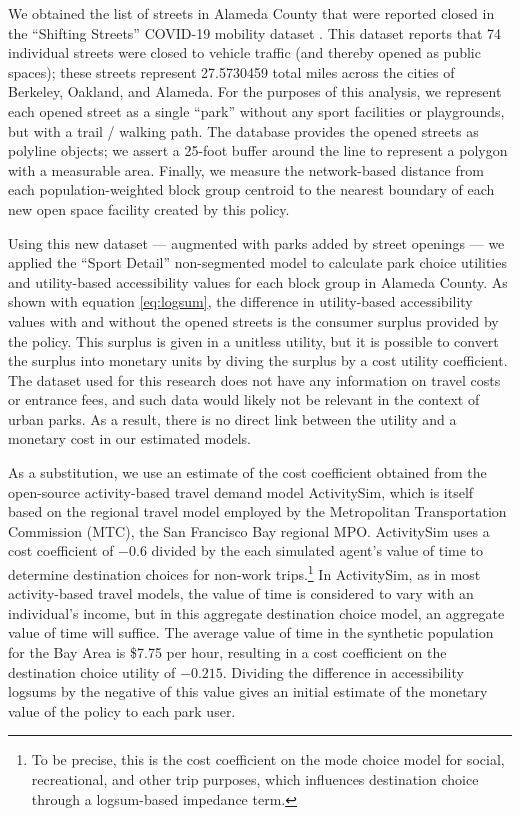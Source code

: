 \documentclass[]{elsarticle} %
\begin{document}
We obtained the list of streets in Alameda County that were reported closed
in the ``Shifting Streets'' COVID-19 mobility dataset \citep{slowstreets}. This dataset
reports that 74 individual streets were closed to vehicle
traffic (and thereby opened as public spaces); these streets represent
27.5730459 total miles across the cities
of Berkeley, Oakland, and Alameda. For the purposes of this analysis, we
represent each opened street as a single ``park'' without any sport facilities or
playgrounds, but with a trail / walking path. The database provides the opened
streets as polyline objects; we assert a 25-foot buffer around the line to
represent a polygon with a measurable area. Finally, we measure the network-based
distance from each population-weighted block group centroid to the nearest
boundary of each new open space facility created by this policy.

Using this new dataset --- augmented with parks added by street openings --- we
applied the ``Sport Detail'' non-segmented model to calculate park choice utilities
and utility-based accessibility values for each block group in Alameda County.
As shown with equation \eqref{eq:logsum}, the difference in utility-based
accessibility values with and without the opened streets is the consumer
surplus provided by the policy. This surplus is given in a unitless utility,
but it is possible to convert the surplus into monetary units by diving the
surplus by a cost utility coefficient. The dataset used for this research does
not have any information on travel costs or entrance fees, and such data would
likely not be relevant in the context of urban parks. As a result, there is no
direct link between the utility and a monetary cost in our estimated models.

As a substitution, we use an estimate of the cost coefficient obtained from the
open-source activity-based travel demand model ActivitySim, which is itself
based on the regional travel model employed by the Metropolitan
Transportation Commission (MTC), the San Francisco Bay regional MPO.
ActivitySim uses a cost coefficient of
\(-0.6\) divided by the each simulated agent's value of time to determine
destination choices for non-work trips.\footnote{To be precise, this is the cost
  coefficient on the mode choice model for social, recreational, and other trip
  purposes, which influences destination choice through a logsum-based impedance
  term.} In ActivitySim, as in most activity-based travel models, the value of
time is considered to vary with an individual's income, but in this aggregate
destination choice model, an aggregate value of time will suffice. The average
value of time in the synthetic population for the Bay Area is \$7.75
per hour, resulting in a cost coefficient on the destination choice utility of
\(-0.215\). Dividing the difference in accessibility logsums by the negative of
this value gives an initial estimate of the monetary value of the policy
to each park user.
\end{document}
